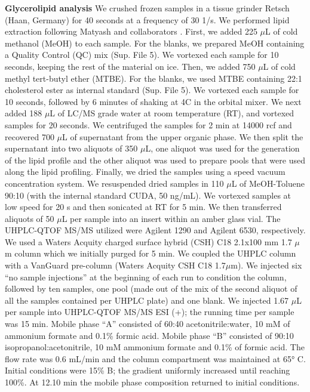 \documentclass[9pt,twocolumn,twoside,lineno]{BioRxiv}
\begin{document}
\textbf{Glycerolipid analysis} 
We crushed frozen samples in a tissue grinder Retsch (Haan, Germany) for 40 seconds at a frequency of 30 1/s. 
We performed lipid extraction following Matyash and collaborators \cite{Matyash2008-ue}. 
First, we added 225 $\mu$L of cold methanol (MeOH) to each sample. 
For the blanks, we prepared MeOH containing a Quality Control (QC) mix (Sup. File 5).
We vortexed each sample for 10 seconds, keeping the rest of the material on ice. 
Then, we added 750 $\mu$L of cold methyl tert-butyl ether (MTBE). 
For the blanks, we used MTBE containing 22:1 cholesterol ester as internal standard (Sup. File 5). 
We vortexed each sample for 10 seconds, followed by 6 minutes of shaking at 4\degree C in the orbital mixer. 
We next added 188 $\mu$L of LC/MS grade water at room temperature (RT), and vortexed samples for 20 seconds.
We centrifuged the samples for 2 min at 14000 rcf and recovered 700 $\mu$L of supernatant from the upper organic phase. 
We then split the supernatant into two aliquots of 350 $\mu$L, one aliquot was used for the generation of the lipid profile and the other aliquot was used to prepare pools that were used along the lipid profiling. 
Finally, we dried the samples using a speed vacuum concentration system.
We resuspended dried samples in 110 $\mu$L of MeOH-Toluene 90:10 (with the internal standard CUDA, 50 ng/mL). 
We vortexed samples at low speed for 20 s and then sonicated at RT for 5 min. 
We then transferred aliquots of 50 $\mu$L per sample into an insert within an amber glass vial.
The UHPLC-QTOF MS/MS utilized were Agilent 1290 and Agilent 6530, respectively. 
We used a Waters Acquity charged surface hybrid (CSH) C18 2.1x100 mm 1.7 $\mu$m column which we initially purged for 5 min. 
We coupled the UHPLC column with a VanGuard pre-column (Waters Acquity CSH C18 1.7$\mu$m). 
We injected six “no sample injections” at the beginning of each run to condition the column, followed by ten samples, one pool (made out of the mix of the second aliquot of all the samples contained per UHPLC plate) and one blank.
We injected 1.67 $\mu$L per sample into UHPLC-QTOF MS/MS ESI (+); the running time per sample was 15 min. 
Mobile phase “A” consisted of 60:40 acetonitrile:water, 10 mM of ammonium formate and 0.1\% formic acid. 
Mobile phase “B” consisted of 90:10 isopropanol:acetonitrile, 10 mM ammonium formate and 0.1\% of formic acid. 
The flow rate was 0.6 mL/min and the column compartment was maintained at 65° C. Initial conditions were 15\% B; the gradient uniformly increased until reaching 100\%. 
At 12.10 min the mobile phase composition returned to initial conditions.
\end{document}
